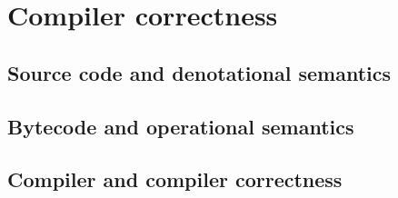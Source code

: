 \section{Compiler correctness}

    \subsection{Source code and denotational semantics}


    \subsection{Bytecode and operational semantics}


    \subsection{Compiler and compiler correctness}

